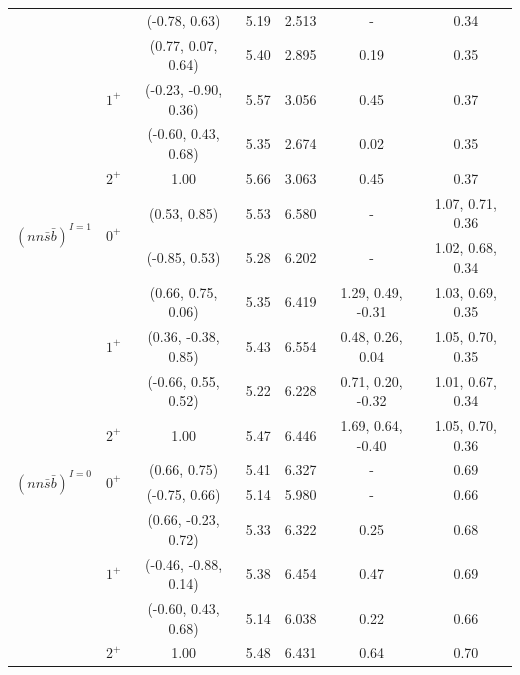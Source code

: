 \documentclass[prd,twocolumn,floatfix,nofootinbib]{revtex4}
\begin{document}
\begin{table}[!htbp]
\begin{tabular}{ccccccc}
                        &           &(-0.78, 0.63)          &5.19	    &2.513	    &-                      &0.34 \\ 
                        &\multirow{3}{*}{$1^{+}$}
                                    &(0.77, 0.07, 0.64)     &5.40	    &2.895	    &0.19                   &0.35 \\ 
                        &           &(-0.23, -0.90, 0.36)   &5.57	    &3.056	    &0.45                   &0.37 \\ 
                        &           &(-0.60, 0.43, 0.68)    &5.35	    &2.674	    &0.02                   &0.35 \\ 
                        &$2^{+}$    &1.00                   &5.66	    &3.063	    &0.45                   &0.37 \\ 

        \multirow{2}{*}{${(nn\bar{s}\bar{b})}^{I=1}$}
                        &\multirow{2}{*}{$0^{+}$}
                                    &(0.53, 0.85)           &5.53	    &6.580	    &-                      &1.07, 0.71, 0.36 \\ 
                        &           &(-0.85, 0.53)          &5.28	    &6.202	    &-                      &1.02, 0.68, 0.34 \\ 
                        &\multirow{3}{*}{$1^{+}$}
                                    &(0.66, 0.75, 0.06)     &5.35	    &6.419	    &1.29, 0.49, -0.31      &1.03, 0.69, 0.35 \\ 
                        &           &(0.36, -0.38, 0.85)    &5.43	    &6.554	    &0.48, 0.26, 0.04       &1.05, 0.70, 0.35 \\ 
                        &           &(-0.66, 0.55, 0.52)    &5.22	    &6.228	    &0.71, 0.20, -0.32      &1.01, 0.67, 0.34 \\ 
                        &$2^{+}$    &1.00                   &5.47	    &6.446	    &1.69, 0.64, -0.40      &1.05, 0.70, 0.36 \\ 
        \multirow{2}{*}{${(nn\bar{s}\bar{b})}^{I=0}$}
                        &\multirow{2}{*}{$0^{+}$}
                                    &(0.66, 0.75)           &5.41	    &6.327	    &-                      &0.69 \\ 
                        &           &(-0.75, 0.66)          &5.14	    &5.980	    &-                      &0.66 \\ 
                        &\multirow{3}{*}{$1^{+}$}                            
                                    &(0.66, -0.23, 0.72)    &5.33	    &6.322	    &0.25                   &0.68 \\ 
                        &           &(-0.46, -0.88, 0.14)   &5.38	    &6.454	    &0.47                   &0.69 \\ 
                        &           &(-0.60, 0.43, 0.68)    &5.14	    &6.038	    &0.22                   &0.66 \\ 
                        &$2^{+}$    &1.00                   &5.48	    &6.431	    &0.64                   &0.70 \\ 
        \hline\hline
    \end{tabular}
\end{table}
\end{document}
